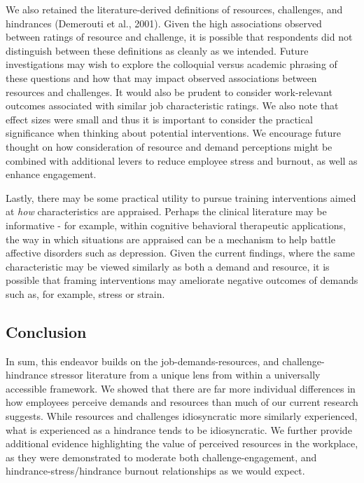 \documentclass[
  man,mask]{apa7}
\begin{document}
We also retained the literature-derived definitions of resources, challenges, and hindrances (Demerouti et al., 2001). Given the high associations observed between ratings of resource and challenge, it is possible that respondents did not distinguish between these definitions as cleanly as we intended. Future investigations may wish to explore the colloquial versus academic phrasing of these questions and how that may impact observed associations between resources and challenges. It would also be prudent to consider work-relevant outcomes associated with similar job characteristic ratings. We also note that effect sizes were small and thus it is important to consider the practical significance when thinking about potential interventions. We encourage future thought on how consideration of resource and demand perceptions might be combined with additional levers to reduce employee stress and burnout, as well as enhance engagement.

Lastly, there may be some practical utility to pursue training interventions aimed at \emph{how} characteristics are appraised. Perhaps the clinical literature may be informative - for example, within cognitive behavioral therapeutic applications, the way in which situations are appraised can be a mechanism to help battle affective disorders such as depression. Given the current findings, where the same characteristic may be viewed similarly as both a demand and resource, it is possible that framing interventions may ameliorate negative outcomes of demands such as, for example, stress or strain.

\hypertarget{conclusion}{%
\subsection{Conclusion}\label{conclusion}}

In sum, this endeavor builds on the job-demands-resources, and challenge-hindrance stressor literature from a unique lens from within a universally accessible framework. We showed that there are far more individual differences in how employees perceive demands and resources than much of our current research suggests. While resources and challenges idiosyncratic more similarly experienced, what is experienced as a hindrance tends to be idiosyncratic. We further provide additional evidence highlighting the value of perceived resources in the workplace, as they were demonstrated to moderate both challenge-engagement, and hindrance-stress/hindrance burnout relationships as we would expect.
\end{document}
